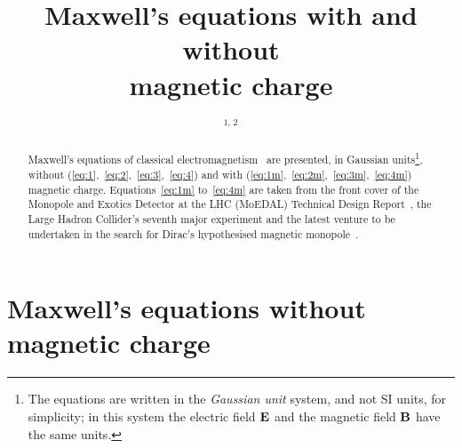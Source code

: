 \documentclass[12pt,a4paper]{iopart}
\begin{document}
%
%


\title{%
Maxwell's equations with and without\\
magnetic charge
}

% 
\author{\theauthorinit$^{1, \, 2}$}
%
\address{$^1$\theauthoraddressA}
\address{$^2$\theauthoraddressB}
\ead{\mailto{\theauthoremail}}

\begin{abstract}
Maxwell's equations of classical electromagnetism~\cite{Maxwell1865}
are presented,
in Gaussian units\footnote{
The equations are written in the \emph{Gaussian unit}
system, and not SI units, for simplicity;
in this system the electric field $\mathbf{E}$
and the magnetic field $\mathbf{B}$ have the same units.},
without (\ref{eq:1},~\ref{eq:2},~\ref{eq:3},~\ref{eq:4})
and
with (\ref{eq:1m},~\ref{eq:2m},~\ref{eq:3m},~\ref{eq:4m})
magnetic charge.
Equations~\ref{eq:1m} to~\ref{eq:4m} are
taken from the front cover of the
Monopole and Exotics Detector at the LHC (MoEDAL)
Technical Design Report~\cite{MoEDAL2009},
the Large Hadron Collider's seventh major experiment
and the latest venture to be undertaken in the search for
Dirac's hypothesised magnetic monopole~\cite{Dirac1931}.
\end{abstract}

\setcounter{tocdepth}{1}
\tableofcontents



\newpage

\section{Maxwell's equations without magnetic charge}
\end{document}
